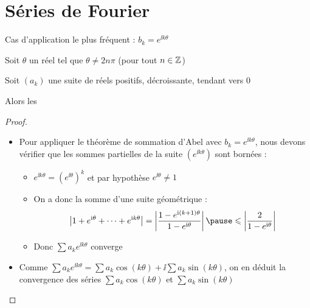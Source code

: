 \section{Séries de Fourier}

\begin{frame}
Cas  d'application le plus fréquent :
$b_k=e^{\ii k\theta}$

\pause
\begin{corollaire}
Soit $\theta$ un réel tel que $\theta \neq 2n\pi$ (pour tout $n \in\mathbb{Z}$)

\pause
Soit $(a_k)$ une suite de réels positifs, décroissante,
tendant vers $0$

\pause
Alors les  
\end{corollaire}
\end{frame}


\begin{frame}

\begin{proof}
\begin{itemize}
\item Pour appliquer le théorème de sommation d'Abel avec 
$b_k=e^{\ii k\theta}$, nous devons
vérifier que les sommes partielles de la suite $(e^{\ii k\theta})$ sont
bornées : 
\begin{itemize}
\item\pause $e^{\ii k\theta}=(e^{\ii \theta})^k$ et par hypothèse 
$e^{\ii \theta}\neq1$
\item\pause On a donc la somme d'une suite géométrique :
$$
\big|1+e^{\ii \theta}+\cdots+e^{\ii k\theta}\big| =
 \left|\frac{1-e^{\ii (k+1)\theta}}{1-e^{\ii \theta}}\right|
\pause \le
\left|\frac{2}{1-e^{\ii \theta}}\right|$$
\item\pause Donc $\displaystyle \sum a_k e^{\ii k\theta}$ converge
\end{itemize}
\item\pause Comme $\sum a_k e^{\ii k\theta} = \sum a_k\cos(k\theta) + \ii \sum a_k\sin(k \theta)$, 
\pause 
on en déduit la convergence des séries $\sum a_k\cos(k\theta)$ et $\sum a_k\sin(k \theta)$
\end{itemize}
\end{proof}
\end{frame}



